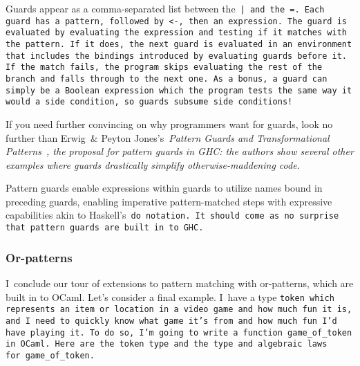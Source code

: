 \documentclass[manuscript,screen 12pt, nonacm]{acmart}
\begin{document}
    Guards appear as a comma-separated list between the~\tt{|} and the~\tt{=}.
    Each guard has a pattern, followed by~\tt{<-}, then an expression. The guard
    is evaluated by evaluating the expression and testing if it matches with the
    pattern. If it does, the next guard is evaluated in an environment that
    includes the bindings introduced by evaluating guards before it. If the
    match fails, the program skips evaluating the rest of the branch and falls
    through to the next one. As a bonus, a guard can simply be a Boolean
    expression which the program tests the same way it would a side condition,
    so guards subsume side conditions! 
    
    If you need further convincing on why programmers want for guards, look no
    further than Erwig~\& Peyton Jones's~\it{Pattern Guards and Transformational
    Patterns}~\citep{guardproposal}, the proposal for pattern guards in GHC: the
    authors show several other examples where guards drastically simplify
    otherwise-maddening code. 
    
    Pattern guards enable expressions within guards to utilize names bound in
    preceding guards, enabling imperative pattern-matched steps with expressive
    capabilities akin to Haskell's~\tt{do} notation. It should come as no
    surprise that pattern guards are built in to GHC.~\raggedbottom
\subsubsection{Or-patterns}
    I~conclude our tour of extensions to pattern matching with or-patterns,
    which are built in to OCaml. Let's consider a final example. I~have a type
    \tt{token} which represents an item or location in a video game and how much
    fun it is, and I~need to quickly know what game it's from and how much fun
    I'd have playing it. To do so, I'm going to write a function
    \tt{game\_of\_token} in OCaml. Here are the~\tt{token} type and the type and
    algebraic laws for~\tt{game\_of\_token}. 
  
\end{document}
